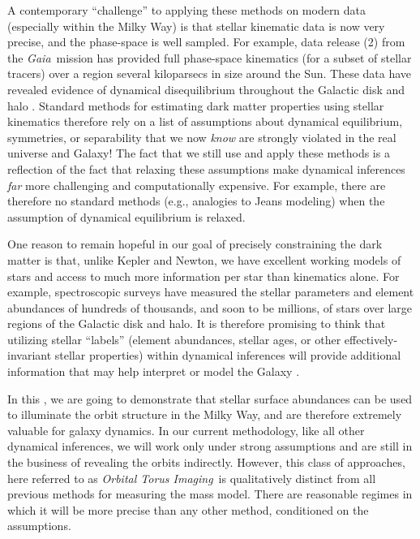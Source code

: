 \documentclass[modern]{aastex63}
\newcommand{\methodname}{\textsl{Orbital Torus Imaging}}
\newcommand{\gaia}{\textsl{Gaia}}
\newcommand{\dr}[1]{\acronym{DR}#1}
\begin{document}
A contemporary ``challenge'' to applying these methods on modern data
(especially within the Milky Way) is that stellar kinematic data is now very
precise, and the phase-space is well sampled.
For example, data release (\dr{2}) from the \gaia\ mission
\citep{Gaia-Collaboration:2016, Gaia-Collaboration:2018} has provided full
phase-space kinematics (for a subset of stellar tracers) over a region several
kiloparsecs in size around the Sun.
These data have revealed evidence of dynamical disequilibrium throughout the
Galactic disk and halo \citep{Antoja:2018, Gaia-Collaboration:2018b,
Myeong:2018, Koppelman:2018, Eilers:2020}.
Standard methods for estimating dark matter properties using stellar kinematics
therefore rely on a list of assumptions about dynamical equilibrium, symmetries,
or separability that we now \emph{know} are strongly violated in the real
universe and Galaxy!
The fact that we still use and apply these methods is a reflection of the fact
that relaxing these assumptions make dynamical inferences \emph{far} more
challenging and computationally expensive.
For example, there are therefore no standard methods (e.g., analogies to Jeans
modeling) when the assumption of dynamical equilibrium is relaxed.

One reason to remain hopeful in our goal of precisely constraining the dark
matter is that, unlike Kepler and Newton, we have excellent working models of
stars and access to much more information per star than kinematics alone.
For example, spectroscopic surveys have measured the stellar parameters and
element abundances of hundreds of thousands, and soon to be millions, of stars
\citep[e.g.,][]{DR16, Martell:2017, Deng:2012} over large regions of the
Galactic disk and halo.
It is therefore promising to think that utilizing stellar ``labels'' (element
abundances, stellar ages, or other effectively-invariant stellar properties)
within dynamical inferences will provide additional information that may help
interpret or model the Galaxy \citep[see, e.g.,][for recent methods that begin
to move in this direction, within the context of equilibrium
models]{Sanders:2015, Das:2016, Binney:2016, Iorio:2020}.

In this \documentname, we are going to demonstrate that stellar surface
abundances can be used to illuminate the orbit structure in the Milky Way, and
are therefore extremely valuable for galaxy dynamics.
In our current methodology, like all other dynamical inferences, we will work
only under strong assumptions and are still in the business of revealing the
orbits indirectly.
However, this class of approaches, here referred to as \methodname\, is
qualitatively distinct from all previous methods for measuring the mass model.
There are reasonable regimes in which it will be more precise than any other
method, conditioned on the assumptions.
\end{document}
